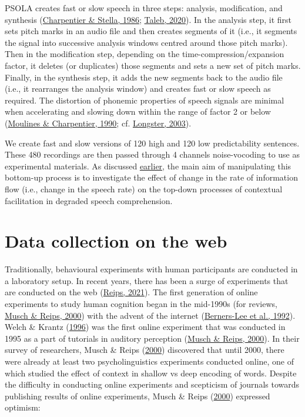 \documentclass[a4paper, nobind]{templates/ociamthesis}
\begin{document}
PSOLA creates fast or slow speech in three steps: analysis, modification, and synthesis (\protect\hyperlink{ref-Charpentier1986}{Charpentier \& Stella, 1986}; \protect\hyperlink{ref-Taleb2020}{Taleb, 2020}).
In the analysis step, it first sets pitch marks in an audio file and then creates segments of it
(i.e., it segments the signal into successive analysis windows centred around those pitch marks).
Then in the modification step, depending on the time-compression/expansion factor, it deletes (or duplicates) those segments and sets a new set of pitch marks.
Finally, in the synthesis step, it adds the new segments back to the audio file (i.e., it rearranges the analysis window) and creates fast or slow speech as required.
The distortion of phonemic properties of speech signals are minimal when accelerating and slowing down within the range of factor 2 or below (\protect\hyperlink{ref-Moulines1990}{Moulines \& Charpentier, 1990}; cf. \protect\hyperlink{ref-Longster2003}{Longster, 2003}).

We create fast and slow versions of 120 high and 120 low predictability sentences.
These 480 recordings are then passed through 4 channels noise-vocoding to use as experimental materials.
As discussed \protect\hyperlink{research-goals}{earlier}, the main aim of manipulating this bottom-up process is to investigate the effect of change in the rate of information flow (i.e., change in the speech rate) on the top-down processes of contextual facilitation in degraded speech comprehension.

\hypertarget{online-experiment}{%
\section{Data collection on the web}\label{online-experiment}}

Traditionally, behavioural experiments with human participants are conducted in a laboratory setup.
In recent years, there has been a surge of experiments that are conducted on the web (\protect\hyperlink{ref-Reips2021}{Reips, 2021}).
The first generation of online experiments to study human cognition began in the mid-1990s (for reviews, \protect\hyperlink{ref-Musch2000}{Musch \& Reips, 2000}) with the advent of the internet (\protect\hyperlink{ref-Bernerslee1992}{Berners-Lee et al., 1992}).
Welch \& Krantz (\protect\hyperlink{ref-Welch1996}{1996}) was the first online experiment that was conducted in 1995 as a part of tutorials in auditory perception (\protect\hyperlink{ref-Musch2000}{Musch \& Reips, 2000}).
In their survey of researchers, Musch \& Reips (\protect\hyperlink{ref-Musch2000}{2000}) discovered that until 2000, there were already at least two psycholinguistics experiments conducted online,
one of which studied the effect of context in shallow vs deep encoding of words.
Despite the difficulty in conducting online experiments and scepticism of journals towards publishing results of online experiments,
Musch \& Reips (\protect\hyperlink{ref-Musch2000}{2000}) expressed optimism:
\end{document}
